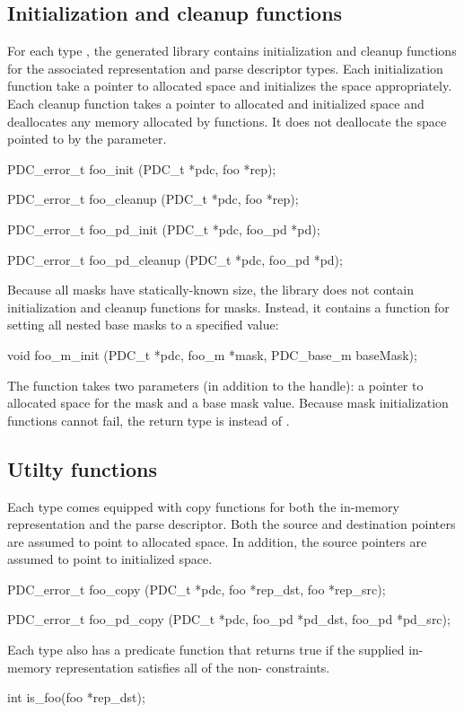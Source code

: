 \subsection{Initialization and cleanup functions}
For each type , the generated library contains
initialization and cleanup functions for the associated representation
 and parse descriptor  types.  Each initialization
function take a pointer to allocated space and initializes the space
appropriately.  Each cleanup function takes a pointer to allocated and
initialized space and deallocates any memory allocated by \pads{} functions.
It does not deallocate the space pointed to by the parameter.  
\begin{code}
PDC_error_t foo_init (PDC_t *pdc, foo *rep);

PDC_error_t foo_cleanup (PDC_t *pdc, foo *rep);

PDC_error_t foo_pd_init (PDC_t *pdc, foo_pd *pd);

PDC_error_t foo_pd_cleanup (PDC_t *pdc, foo_pd *pd);
\end{code}
Because all masks have statically-known size, the library does not
contain initialization and cleanup functions for masks.  
Instead, it contains a function for setting all nested base masks 
to a specified value:  
\begin{code}
void foo_m_init (PDC_t *pdc, foo_m *mask, PDC_base_m baseMask);
\end{code}
The function takes two parameters (in
addition to the \pads{} handle): a pointer to allocated space for the
mask and a base mask value.  Because mask initialization
functions cannot fail, the return type is  instead of
. 

\subsection{Utilty functions}
Each type  comes equipped with copy functions for both the
in-memory representation and the parse descriptor.  Both the source
and destination pointers are assumed to point to allocated space.  In
addition, the source pointers are assumed to point to initialized space.
\begin{code}
PDC_error_t foo_copy (PDC_t *pdc, foo *rep_dst, foo *rep_src);

PDC_error_t foo_pd_copy (PDC_t *pdc, foo_pd *pd_dst, foo_pd *pd_src);
\end{code}

\noindent
Each type  also has a predicate function that returns true if
the supplied in-memory representation satisfies all of the
non-\pparsecheck{} constraints.
\begin{code}
int is_foo(foo *rep_dst);
\end{code}


